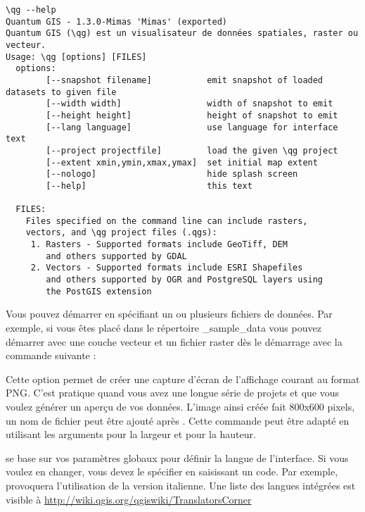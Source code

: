 \small
\begin{verbatim}
\qg --help
Quantum GIS - 1.3.0-Mimas 'Mimas' (exported)
Quantum GIS (\qg) est un visualisateur de données spatiales, raster ou vecteur.
Usage: \qg [options] [FILES]
  options:
		[--snapshot filename]           emit snapshot of loaded datasets to given file
		[--width width]                 width of snapshot to emit
		[--height height]               height of snapshot to emit
		[--lang language]               use language for interface text
		[--project projectfile]         load the given \qg project
		[--extent xmin,ymin,xmax,ymax]  set initial map extent
		[--nologo]                      hide splash screen
		[--help]                        this text

  FILES:
    Files specified on the command line can include rasters,
    vectors, and \qg project files (.qgs):
     1. Rasters - Supported formats include GeoTiff, DEM
        and others supported by GDAL
     2. Vectors - Supported formats include ESRI Shapefiles
        and others supported by OGR and PostgreSQL layers using
        the PostGIS extension
\end{verbatim}
\normalsize

\begin{Astuce} \caption{\textsc{Exemple utilisant des options de ligne de commande}}
Vous pouvez démarrer \qg en spécifiant un ou plusieurs fichiers de données. Par exemple, si vous êtes placé dans le répertoire \qg\_sample\_data vous pouvez démarrer \qg avec une couche vecteur et un fichier raster dès le démarrage avec la commande suivante : 
\end{Astuce}

Cette option permet de créer une capture d'écran de l'affichage courant au format PNG. C'est pratique quand vous avez une longue série de projets et que vous voulez générer un aperçu de vos données. L'image ainsi créée fait 800x600 pixels, un nom de fichier peut être ajouté après . Cette commande peut être adapté en utilisant les arguments  pour la largeur et  pour la hauteur.

\qg se base sur vos paramètres globaux pour définir la langue de l'interface. Si vous voulez en changer, vous devez le spécifier en saisissant un code. 
Par exemple,  provoquera l'utilisation de la version italienne. Une liste des langues intégrées est visible à \url{http://wiki.qgis.org/qgiswiki/TranslatorsCorner}

